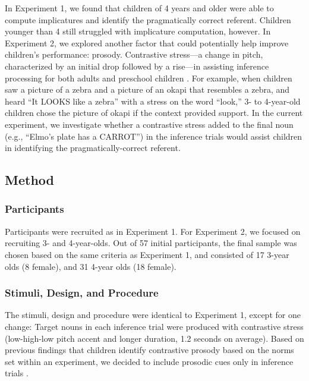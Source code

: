 \documentclass[10pt,letterpaper]{article}
\begin{document}
In Experiment 1, we found that children of 4 years and older were able to compute implicatures and identify the pragmatically correct referent. Children younger than 4 still struggled with implicature computation, however. In Experiment 2, we explored another factor that could potentially help improve children's performance: prosody. Contrastive stress---a change in pitch, characterized by an initial drop followed by a rise---in assisting inference processing for both adults \cite{ito2008anticipatory} and preschool children \cite{kurumada1contextual}. For example, when children saw a picture of a zebra and a picture of an okapi that resembles a zebra, and heard ``It LOOKS like a zebra'' with a stress on the word ``look,'' 3- to 4-year-old children chose the picture of okapi if the context provided support. In the current experiment, we investigate whether a contrastive stress added to the final noun (e.g., ``Elmo's plate has a CARROT'') in the inference trials would assist children in identifying the pragmatically-correct referent.

\subsection{Method}

\subsubsection{Participants}

Participants were recruited as in Experiment 1. For Experiment 2, we focused on recruiting 3- and 4-year-olds. Out of 57 initial participants, the final sample was chosen based on the same criteria as Experiment 1, and consisted of 17 3-year olds (8 female), and 31 4-year olds (18 female).

\subsubsection{Stimuli, Design, and Procedure}

The stimuli, design and procedure were identical to Experiment 1, except for one change: Target nouns in each inference trial were produced with contrastive stress (low-high-low pitch accent and longer duration, 1.2 seconds on average). Based on previous findings that children identify contrastive prosody based on the norms set within an experiment, we decided to include prosodic cues only in inference trials \cite{kurumada1contextual}. 
\end{document}
